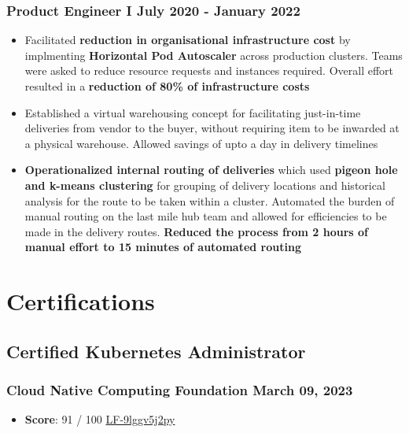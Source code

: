 \documentclass[12pt]{article}
\newcommand{\experienceItem}{\item [-] \small}
\newcommand{\spacedSubSubSection}[2]{\subsubsection {{#1} \hspace*{\fill} {#2}}}
\begin{document}
{{{            \spacedSubSubSection{Product Engineer I}{July 2020 - January 2022}
            {
                \begin{itemize}[itemsep=0.1ex, leftmargin=6ex, rightmargin=1ex]
                    \experienceItem
                    {
                        Facilitated \textbf {reduction in organisational infrastructure cost} by implmenting
                        \textbf {Horizontal Pod Autoscaler} across production clusters. Teams were asked to reduce
                        resource requests and instances required. Overall effort resulted in a
                        \textbf {reduction of 80\% of infrastructure costs}
                    }
                    \experienceItem
                    {
                        Established a virtual warehousing concept for facilitating just-in-time deliveries from
                        vendor to the buyer, without requiring item to be inwarded at a physical warehouse. Allowed
                        savings of upto a day in delivery timelines
                    }
                    \experienceItem
                    {
                        \textbf {Operationalized internal routing of deliveries} which used \textbf {pigeon hole and
                        k-means \mbox {clustering}} for grouping of delivery locations and historical analysis for the route to be
                        taken within a cluster. Automated the burden of manual routing on the last mile hub team and allowed
                        for efficiencies to be made in the delivery routes. \textbf {Reduced the process from 2 hours of
                        manual effort to 15 minutes of automated routing}
                    }
            \end{itemize}
        }
    }

    \section{Certifications}
    {
        \subsection{Certified Kubernetes Administrator}
        \spacedSubSubSection{Cloud Native Computing Foundation}{March 09, 2023}
        {

            \begin{itemize}[itemsep=0.1ex, leftmargin=6ex, rightmargin=1ex]
                \item [] \small \textbf {Score}: 91 / 100 \hspace*{\fill} \href{https://www.credly.com/badges/60f68033-19cb-4fab-90f1-0dc374675f5b/linked_in_profile}{\scriptsize LF-9lggv5j2py}
            \end{itemize}
        }

}}}
\end{document}

